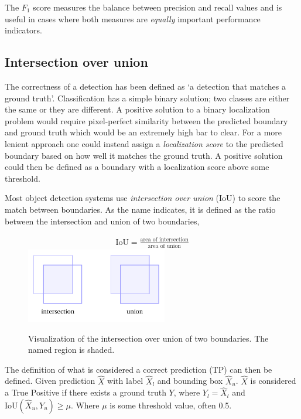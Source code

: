 The \(F_1\) score measures the balance between precision and recall values and is useful in cases where both measures are \textit{equally} important performance indicators.

\subsection{Intersection over union}
The correctness of a detection has been defined as `a detection that matches a ground truth'.
Classification has a simple binary solution; two classes are either the same or they are different.
A positive solution to a binary localization problem would require pixel-perfect similarity between the predicted boundary and ground truth which would be an extremely high bar to clear.
For a more lenient approach one could instead assign a \textit{localization score} to the predicted boundary based on how well it matches the ground truth.
A positive solution could then be defined as a boundary with a localization score above some threshold.

Most object detection systems use \textit{intersection over union} (IoU) to score the match between boundaries.
As the name indicates, it is defined as the ratio between the intersection and union of two boundaries,

\begin{figure}[htb]
  \centering
  \begin{gather*}
    \text{IoU}=\frac{\text{area of intersection}}{\text{area of union}}
  \end{gather*}
  \includegraphics[width=0.55\textwidth]{figs/background/iou.pdf}
\caption[Intersection over union]{Visualization of the intersection over union of two boundaries.
The named region is shaded.}\label{fig:iou}
\end{figure}

The definition of what is considered a correct prediction (TP) can then be defined.
Given prediction \(\hat{X}\) with label \(\hat{X}_l\) and bounding box \(\hat{X}_u\). \(\hat{X}\) is considered a True Positive if there exists a ground truth \(Y\), where \(Y_{l}=\hat{X}_l\) and \(\text{IoU}(\hat{X}_u, Y_{u})\ge \mu \).
Where \( \mu \) is some threshold value, often 0.5.

